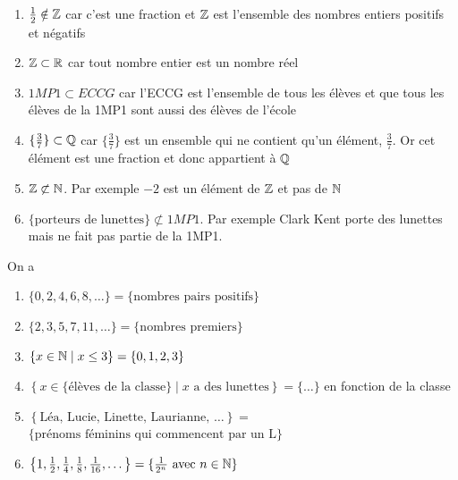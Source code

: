 \begin{solution}
	\begin{enumerate}
	\item $\frac{1}{2} \notin \mathbb{Z}$ car c'est une fraction et $\mathbb{Z}$ est l'ensemble des nombres entiers positifs et négatifs
	\item $\mathbb{Z} \subset \mathbb{R}$ car tout nombre entier est un nombre réel
	\item $1MP1 \subset ECCG$ car l'ECCG est l'ensemble de tous les élèves et que tous les élèves de la 1MP1 sont aussi des élèves de l'école
	\item $\{\frac{3}{7}\} \subset \mathbb{Q}$ car $\{\frac{3}{7}\}$ est un ensemble qui ne contient qu'un élément, $\frac{3}{7}$. Or cet élément est une fraction et donc appartient à $\mathbb{Q}$
	\item $\mathbb{Z} \not \subset \mathbb{N}$. Par exemple $-2$ est un élément de $\mathbb{Z}$ et pas de $\mathbb{N}$
	\item $\{\mbox{porteurs de lunettes}\} \not \subset 1MP1$. Par exemple Clark Kent porte des lunettes mais ne fait pas partie de la 1MP1.
	\end{enumerate}
\end{solution}

\begin{solution}On a
	\begin{enumerate}
	\item
	$
	\{0,2,4,6,8,\dots\} = \{\mbox{nombres pairs positifs}\}
	$
	\item
	$
	\{2,3,5,7,11,\dots \} = \{\mbox{nombres premiers}\}
	$
	\item
	$
	\left\{ x\in \mathbb{N} \; | \; x\leq 3\right\} = \{0,1,2,3\}
	$
	\item
	$
	\left\{ x\in \{ \mbox{élèves de la classe} \} \; | \; x \mbox{ a des lunettes} \right\} = \{\dots\}
	$ en fonction de la classe
	\item
	$
	\left\{ \mbox{Léa, Lucie, Linette, Laurianne, } \dots \right\} =$\newline $ \{\mbox{prénoms féminins}\mbox{ qui commencent par un L}\}
	$
	\item 
	$
	\left\{1, \frac{1}{2}, \frac{1}{4}, \frac{1}{8}, \frac{1}{16}, \dots \right\} = \{\frac{1}{2^n} \mbox{ avec } n\in \mathbb{N}\}
	$
	\end{enumerate}
\end{solution}

